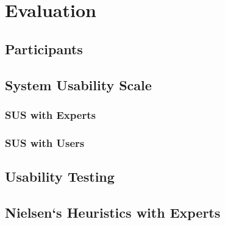 \chapter{Evaluation}
\section{Participants}
\section{System Usability Scale}
\subsection{SUS with Experts}
\subsection{SUS with Users}
\section{Usability Testing}
\section{Nielsen`s Heuristics with Experts}
